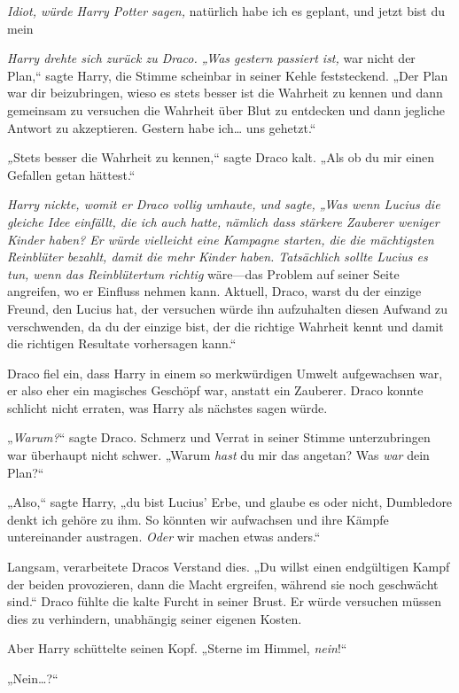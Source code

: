 {\emph{Idiot, würde Harry Potter sagen,} natürlich habe ich es geplant, und jetzt bist du mein\later

\emph{Harry drehte sich zurück zu Draco. „Was gestern passiert ist,} war nicht der Plan,“ sagte Harry, die Stimme scheinbar in seiner Kehle feststeckend. „Der Plan war dir beizubringen, wieso es stets besser ist die Wahrheit zu kennen und dann gemeinsam zu versuchen die Wahrheit über Blut zu entdecken und dann jegliche Antwort zu akzeptieren. Gestern habe ich… uns gehetzt.“

\emph{„}Stets besser die Wahrheit zu kennen,“ sagte Draco kalt. „Als ob du mir einen Gefallen getan hättest.“

\emph{Harry nickte, womit er Draco vollig umhaute, und sagte, „Was wenn Lucius die gleiche Idee einfällt, die ich auch hatte, nämlich dass stärkere Zauberer weniger Kinder haben? Er würde vielleicht eine Kampagne starten, die die mächtigsten Reinblüter bezahlt, damit die mehr Kinder haben. Tatsächlich sollte Lucius es tun, wenn das Reinblütertum richtig} wäre—das Problem auf seiner Seite angreifen, wo er Einfluss nehmen kann. Aktuell, Draco, warst du der einzige Freund, den Lucius hat, der versuchen würde ihn aufzuhalten diesen Aufwand zu verschwenden, da du der einzige bist, der die richtige Wahrheit kennt und damit die richtigen Resultate vorhersagen kann.“

Draco fiel ein, dass Harry in einem so merkwürdigen Umwelt aufgewachsen war, er also eher ein magisches Geschöpf war, anstatt ein Zauberer. Draco konnte schlicht nicht erraten, was Harry als nächstes sagen würde.

„\emph{Warum?}“ sagte Draco. Schmerz und Verrat in seiner Stimme unterzubringen war überhaupt nicht schwer. „Warum \emph{hast} du mir das angetan? Was \emph{war} dein Plan?“

„Also,“ sagte Harry, „du bist Lucius' Erbe, und glaube es oder nicht, Dumbledore denkt ich gehöre zu ihm. So könnten wir aufwachsen und ihre Kämpfe untereinander austragen. \emph{Oder} wir machen etwas anders.“

Langsam, verarbeitete Dracos Verstand dies. „Du willst einen endgültigen Kampf der beiden provozieren, dann die Macht ergreifen, während sie noch geschwächt sind.“ Draco fühlte die kalte Furcht in seiner Brust. Er würde versuchen müssen dies zu verhindern, unabhängig seiner eigenen Kosten.

Aber Harry schüttelte seinen Kopf. „Sterne im Himmel, \emph{nein}!“

„Nein…?“

}
